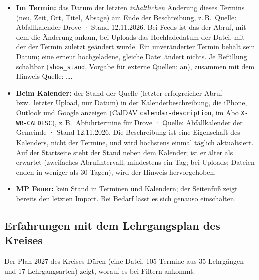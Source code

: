 \documentclass[a4paper,fontsize=10pt]{scrartcl}
\newcommand{\code}[1]{\texttt{#1}}
\begin{document}
\begin{itemize}
  \item \textbf{Im Termin:} das Datum der letzten \emph{inhaltlichen}
        Änderung dieses Termins (neu, Zeit, Ort, Titel, Absage) am Ende der
        Beschreibung, z.\,B.\ \glqq Quelle: Abfallkalender Drove · Stand
        12.11.2026\grqq. Bei Feeds ist das der Abruf, mit dem die Änderung
        ankam, bei Uploads das Hochladedatum der Datei, mit der der Termin
        zuletzt geändert wurde. Ein unveränderter Termin behält sein Datum;
        eine erneut hochgeladene, gleiche Datei ändert nichts. Je Befüllung
        schaltbar (\code{show\_stand}, Vorgabe für externe Quellen: an),
        zusammen mit dem Hinweis \glqq Quelle: \dots\grqq.
  \item \textbf{Beim Kalender:} der Stand der Quelle (letzter erfolgreicher
        Abruf bzw.\ letzter Upload, nur Datum) in der Kalenderbeschreibung,
        die iPhone, Outlook und Google anzeigen (CalDAV
        \code{calendar-description}, im Abo \code{X-WR-CALDESC}), z.\,B.\
        \glqq Abfuhrtermine für Drove · Quelle: Abfallkalender der Gemeinde ·
        Stand 12.11.2026\grqq. Die Beschreibung ist eine Eigenschaft des
        Kalenders, nicht der Termine, und wird höchstens einmal täglich
        aktualisiert. Auf der Startseite steht der Stand neben dem Kalender;
        ist er älter als erwartet (zweifaches Abrufintervall, mindestens ein
        Tag; bei Uploads: Dateien enden in weniger als 30 Tagen), wird der
        Hinweis hervorgehoben.
  \item \textbf{MP Feuer:} kein Stand in Terminen und Kalendern; der Seitenfuß
        zeigt bereits den letzten Import. Bei Bedarf lässt es sich genauso
        einschalten.
\end{itemize}

\subsection{Erfahrungen mit dem Lehrgangsplan des Kreises}

Der Plan 2027 des Kreises Düren (eine Datei, 105 Termine aus 35 Lehrgängen
und 17 Lehrgangsarten) zeigt, worauf es bei Filtern ankommt:
\end{document}
